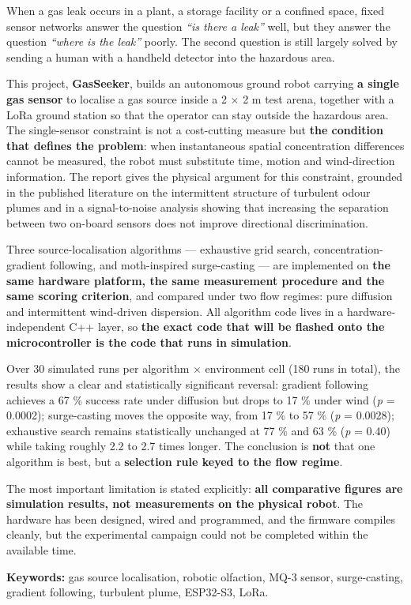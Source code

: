 When a gas leak occurs in a plant, a storage facility or a confined space, fixed sensor networks answer the question \textit{``is there a leak''} well, but they answer the question \textit{``where is the leak''} poorly. The second question is still largely solved by sending a human with a handheld detector into the hazardous area.

This project, \textbf{GasSeeker}, builds an autonomous ground robot carrying \textbf{a single gas sensor} to localise a gas source inside a 2 $\times$ 2 m test arena, together with a LoRa ground station so that the operator can stay outside the hazardous area. The single-sensor constraint is not a cost-cutting measure but \textbf{the condition that defines the problem}: when instantaneous spatial concentration differences cannot be measured, the robot must substitute time, motion and wind-direction information. The report gives the physical argument for this constraint, grounded in the published literature on the intermittent structure of turbulent odour plumes and in a signal-to-noise analysis showing that increasing the separation between two on-board sensors does not improve directional discrimination.

Three source-localisation algorithms --- exhaustive grid search, concentration-gradient following, and moth-inspired surge-casting --- are implemented on \textbf{the same hardware platform, the same measurement procedure and the same scoring criterion}, and compared under two flow regimes: pure diffusion and intermittent wind-driven dispersion. All algorithm code lives in a hardware-independent C++ layer, so \textbf{the exact code that will be flashed onto the microcontroller is the code that runs in simulation}.

Over 30 simulated runs per algorithm $\times$ environment cell (180 runs in total), the results show a clear and statistically significant reversal: gradient following achieves a 67 \% success rate under diffusion but drops to 17 \% under wind (\textit{p} = 0.0002); surge-casting moves the opposite way, from 17 \% to 57 \% (\textit{p} = 0.0028); exhaustive search remains statistically unchanged at 77 \% and 63 \% (\textit{p} = 0.40) while taking roughly 2.2 to 2.7 times longer. The conclusion is \textbf{not} that one algorithm is best, but a \textbf{selection rule keyed to the flow regime}.

The most important limitation is stated explicitly: \textbf{all comparative figures are simulation results, not measurements on the physical robot}. The hardware has been designed, wired and programmed, and the firmware compiles cleanly, but the experimental campaign could not be completed within the available time.

\noindent \textbf{Keywords:} gas source localisation, robotic olfaction, MQ-3 sensor, surge-casting, gradient following, turbulent plume, ESP32-S3, LoRa.
